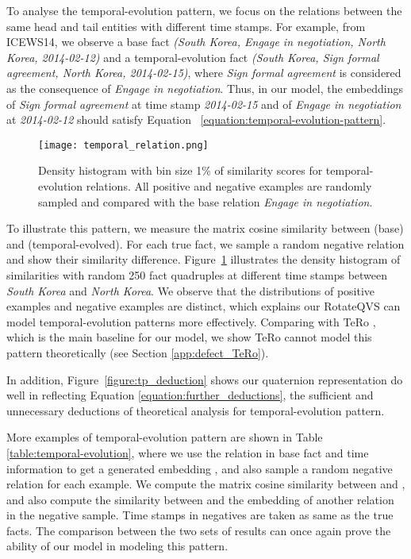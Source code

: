 \documentclass[11pt]{article}
\newcommand{\exam}[1]{\emph{#1}\xspace}
\begin{document}
To analyse the temporal-evolution pattern, we focus on the relations between the same head and tail entities with different time stamps.
For example, from ICEWS14, we observe a base fact \textit{(South Korea, Engage in negotiation, North Korea, 2014-02-12)} and a temporal-evolution fact \textit{(South Korea, Sign formal agreement, North Korea, 2014-02-15)}, where \exam{Sign formal agreement} is considered as the consequence of \exam{Engage in negotiation}.
Thus, in our model, the embeddings of \textit{Sign formal agreement} at time stamp \textit{2014-02-15} and of \textit{Engage in negotiation} at \textit{2014-02-12} should satisfy Equation~ \ref{equation:temporal-evolution-pattern}.


\begin{figure}[!t]
\centering
\texttt{[image: temporal\_relation.png]} 
\caption{Density histogram with bin size 1\% of similarity scores for temporal-evolution relations. All positive and negative examples are randomly sampled and compared with the base relation \exam{Engage in negotiation}.}
\label{figure:temporal_examples}
\end{figure}

To illustrate this pattern, we measure the matrix cosine similarity between  (base) and  (temporal-evolved).
For each true fact, we sample a random negative relation and show their similarity difference.
Figure~\ref{figure:temporal_examples} illustrates the density histogram of similarities with random 250 fact quadruples at different time stamps between \textit{South Korea} and \textit{North Korea}.
We observe that the distributions of positive examples and negative examples are distinct, which explains our RotateQVS can model temporal-evolution patterns more effectively.
Comparing with TeRo \cite{xu2020tero}, which is the main baseline for our model, we show TeRo cannot model this pattern theoretically (see Section \ref{app:defect_TeRo}).

In addition, Figure~\ref{figure:tp_deduction} shows our quaternion representation do well in reflecting Equation \ref{equation:further_deductions}, the sufficient and unnecessary deductions of theoretical analysis for temporal-evolution pattern.

More examples of temporal-evolution pattern are shown in Table~ \ref{table:temporal-evolution}, where we use the relation in base fact and time information to get a generated embedding , and also sample a random negative relation for each example.
We compute the matrix cosine similarity between  and , and also compute the similarity between  and the embedding of another relation in the negative sample.
Time stamps in negatives are taken as same as the true facts.
The comparison between the two sets of results can once again prove the ability of our model in modeling this pattern.
\end{document}
